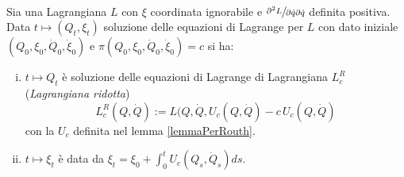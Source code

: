 \documentclass[11pt,a4paper,twoside]{book}
\newenvironment{proposizione}[1][\empty]{\begin{Proposizione}{
\ifx\empty#1\relax\else\mdseries\itshape#1\\\fi
}{}}{\end{Proposizione}}
\theoremstyle{esss}
\theoremstyle{dotless}
\numberwithin{equation}{section} %
\begin{document}
\begin{proposizione}Sia una Lagrangiana $L$ con $\xi$ coordinata ignorabile e $\sfrac{\partial^2 L}{\partial\dot{q}\partial\dot{q}}$ definita positiva. Data $t\mapsto (Q_t,\xi_t)$ soluzione delle equazioni di Lagrange per $L$ con dato iniziale $(Q_0,\xi_0,\dot{Q}_0,\dot{\xi}_0)$ e $\pi(Q_0,\xi_0,\dot{Q}_0,\dot{\xi}_0)=c$ si ha:\begin{enumerate}[i.]
\item $t\mapsto Q_t$ è soluzione delle equazioni di Lagrange di Lagrangiana $L^R_c$ (\textit{Lagrangiana ridotta})
\begin{equation}
L^R_c(Q,\dot{Q}):=L(Q,\dot{Q},U_c(Q,\dot{Q}) - c\,U_c(Q,\dot{Q})
\end{equation}
con la $U_c$ definita nel lemma \ref{lemmaPerRouth}.

\item $t\mapsto\xi_t$ è data da $\xi_t=\xi_0+\int_0^t U_c(Q_s,\dot{Q}_s) ds$.
\end{enumerate}
\end{proposizione}
\end{document}
